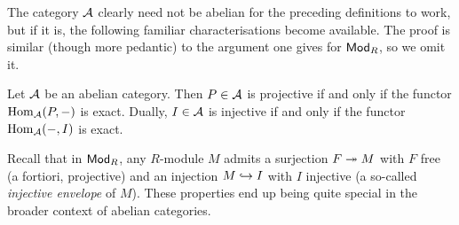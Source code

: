 The category $\abcat{A}$ clearly need not be abelian for the
preceding definitions to work, but if it is, the following familiar
characterisations become available.
The proof is similar (though more pedantic) to the argument one gives
for ${\mathsf{Mod}}_{{R}}$, so we omit it.

\begin{proposition}
  Let $\abcat{A}$ be an abelian category.
  Then $P \in \abcat{A}$ is projective if and only if the functor
  $\operatorname{Hom}_{\mathcal{A}}(P, -)$ is exact.
  Dually, $I \in \abcat{A}$ is injective if and only if the functor
  $\operatorname{Hom}_{\mathcal{A}}(-, I)$ is exact.
\end{proposition}

\iffalse
\begin{lemma}[Splitting lemma]
  \label{lemma_splitting}
  In an abelian category, the following are equivalent:
  \begin{enumerate}
    \item
      The short exact sequence $0 \to A \stackrel{f}{\to} B
      \stackrel{g}{\to} C \to 0$ splits.

    \item
      There is a morphism $s: B \to A$ such that $sf = \id_{A}$.

    \item
      There is a morphism $t: C \to B$ such that $gu = \id_{C}$.
  \end{enumerate}
\end{lemma}

\begin{proposition}
  \label{prop_proj_inj_iff_ses_splits}
  If $\abcat{A}$ is abelian, then $P \in \abcat{A}$ is projective
  if and only if any short exact sequence ending at $P$ splits:
  \[
    \begin{tikzcd}[cramped]
      0 & A & B & P & 0.
      \arrow[from=1-1, to=1-2]
      \arrow[from=1-2, to=1-3]
      \arrow[from=1-3, to=1-4]
      \arrow[from=1-4, to=1-5]
    \end{tikzcd}
  \]
  Dually, $I \in \abcat{A}$ is injective if and only if any short
  exact sequence starting at $I$ splits:
  \[
    \begin{tikzcd}[cramped]
      0 & I & B & C & 0.
      \arrow[from=1-1, to=1-2]
      \arrow[from=1-2, to=1-3]
      \arrow[from=1-3, to=1-4]
      \arrow[from=1-4, to=1-5]
    \end{tikzcd}
  \]
\end{proposition}
\fi

Recall that in ${\mathsf{Mod}}_{{R}}$, any $R$-module $M$ admits a surjection $F
\twoheadrightarrow M$ with $F$ free (a fortiori, projective) and an injection $M
\hookrightarrow I$ with $I$ injective (a so-called \emph{injective envelope} of $M$).
These properties end up being quite special in the broader context of
abelian categories.

